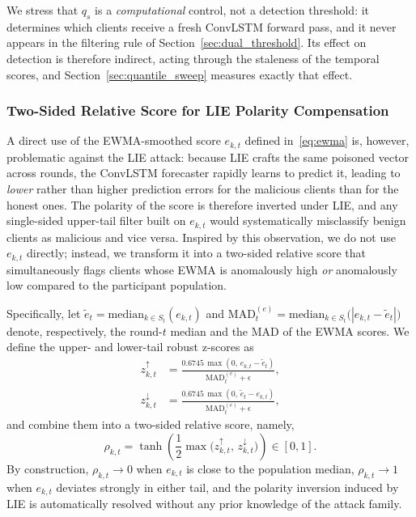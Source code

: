 \documentclass[journal]{IEEEtran}
\begin{document}
We stress that $q_s$ is a \emph{computational} control, not a detection threshold: it determines which clients receive a fresh ConvLSTM forward pass, and it never appears in the filtering rule of Section~\ref{sec:dual_threshold}. Its effect on detection is therefore indirect, acting through the staleness of the temporal scores, and Section~\ref{sec:quantile_sweep} measures exactly that effect.

\subsubsection{Two-Sided Relative Score for LIE Polarity Compensation}
A direct use of the EWMA-smoothed score $e_{k,t}$ defined in~\eqref{eq:ewma} is, however, problematic against the LIE attack: because LIE crafts the same poisoned vector across rounds, the ConvLSTM forecaster rapidly learns to predict it, leading to \emph{lower} rather than higher prediction errors for the malicious clients than for the honest ones. The polarity of the score is therefore inverted under LIE, and any single-sided upper-tail filter built on $e_{k,t}$ would systematically misclassify benign clients as malicious and vice versa. Inspired by this observation, we do not use $e_{k,t}$ directly; instead, we transform it into a two-sided relative score that simultaneously flags clients whose EWMA is anomalously high \emph{or} anomalously low compared to the participant population.

Specifically, let $\tilde{e}_t = \mathrm{median}_{k\in S_t}(e_{k,t})$ and $\mathrm{MAD}_t^{(e)} = \mathrm{median}_{k\in S_t}\bigl(|e_{k,t}-\tilde{e}_t|\bigr)$ denote, respectively, the round-$t$ median and the MAD of the EWMA scores. We define the upper- and lower-tail robust z-scores as
\begin{align}
z_{k,t}^{\uparrow} &= \frac{0.6745\,\max(0,\, e_{k,t}-\tilde{e}_t)}{\mathrm{MAD}_t^{(e)}+\epsilon}, \label{eq:z_up}\\
z_{k,t}^{\downarrow} &= \frac{0.6745\,\max(0,\, \tilde{e}_t-e_{k,t})}{\mathrm{MAD}_t^{(e)}+\epsilon}, \label{eq:z_down}
\end{align}
and combine them into a two-sided relative score, namely,
\begin{equation}
\rho_{k,t} = \tanh\!\left(\frac{1}{2}\max\!\bigl(z_{k,t}^{\uparrow},\, z_{k,t}^{\downarrow}\bigr)\right) \in [0,1].
\label{eq:rho_score}
\end{equation}
By construction, $\rho_{k,t} \to 0$ when $e_{k,t}$ is close to the population median, $\rho_{k,t} \to 1$ when $e_{k,t}$ deviates strongly in either tail, and the polarity inversion induced by LIE is automatically resolved without any prior knowledge of the attack family.
\end{document}
